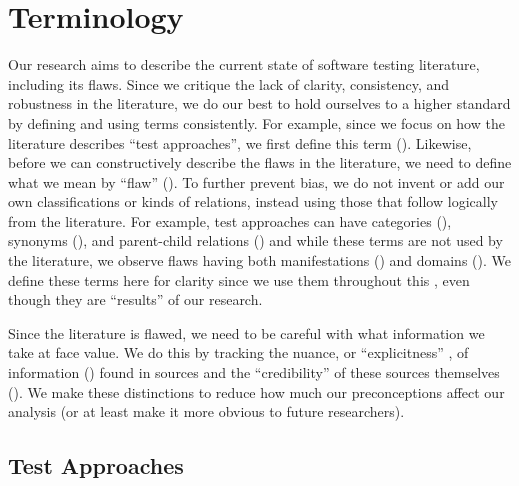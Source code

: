 \section{Terminology}\label{terminology}

Our research aims to describe the current state of software testing literature,
including its flaws. Since we critique the lack of clarity, consistency, and
robustness in the literature, we do our best to hold ourselves to a higher
standard by defining and using terms consistently. For example, since we focus
on how the literature describes ``test approaches'', we first define this term
(). Likewise, before we can constructively describe
the flaws in the literature, we need to define what we mean by ``flaw''
(). To further prevent bias, we do not invent or add our own
classifications or kinds of relations, instead using those that follow
logically from the literature. For example, test approaches can have categories
(), synonyms (), and parent-child relations
() and while these terms are not used by the literature, we
observe flaws having both manifestations () and domains
(). We define these terms here for clarity since we use them
throughout this \docType{}, even though they are ``results'' of our research.

Since the literature is flawed, we need to be careful with what information we
take at face value. We do this by tracking the nuance, or ``explicitness''%
, of information () found in sources and
the ``credibility'' of these sources themselves (). We make these
distinctions to reduce how much our preconceptions affect our analysis (or at
least make it more obvious to future researchers).

\subsection{Test Approaches}\label{approach-def}

